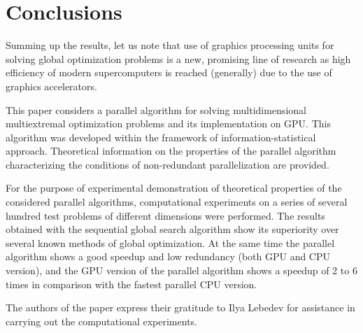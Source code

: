 \documentclass[smallcondensed]{svjour3}     %
\begin{document}
\section{Conclusions} \label{sec:7}

Summing up the results, let us note that use of graphics processing units for solving global optimization problems is a new, promising line of research as high efficiency of modern supercomputers is reached (generally) due to the use of graphics accelerators. 

This paper considers a parallel algorithm for solving multidimensional multiextremal optimization problems and its implementation on GPU. This algorithm was developed within the framework of information-statistical approach. Theoretical information on the properties of the parallel algorithm characterizing the conditions of non-redundant parallelization are provided.

For the purpose of experimental demonstration of theoretical properties of the considered parallel algorithms, computational experiments on a series of several hundred test problems of different dimensions were performed. The results obtained with the sequential global search algorithm show its superiority over several known methods of global optimization. At the same time the parallel algorithm shows a good speedup and low redundancy (both GPU and CPU version), and the GPU version of the parallel algorithm shows a speedup of 2 to 6 times in comparison with the fastest parallel CPU version.

\begin{acknowledgements}

The authors of the paper express their gratitude to Ilya Lebedev for assistance in carrying out the computational experiments.

\end{acknowledgements}

\end{document}
